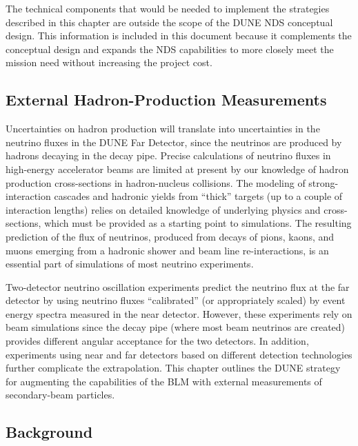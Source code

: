 The technical components that would be needed to implement the strategies 
described in this chapter are outside the scope of the DUNE NDS conceptual 
design. This information is included in this document because it complements the conceptual 
design and expands the NDS capabilities to more closely meet the mission need without increasing the project cost.

\subsection{External Hadron-Production Measurements}
\label{sec:detectors-nd-external-hadron}

Uncertainties on hadron production will translate into uncertainties in the neutrino fluxes
in the DUNE Far Detector, since the neutrinos are produced by hadrons decaying in the decay pipe. Precise calculations of neutrino fluxes in high-energy accelerator beams are limited
at present by our knowledge of hadron production cross-sections in hadron-nucleus collisions. 
The modeling of strong-interaction cascades and hadronic yields from ``thick'' targets
(up to a couple of interaction lengths) relies on detailed knowledge of underlying physics
and cross-sections, which must be provided as a starting point to simulations. The resulting 
prediction of the flux of neutrinos, produced from decays of pions, kaons, and muons
emerging from a hadronic shower and beam line re-interactions, is an essential part
of simulations of most neutrino experiments. 

Two-detector neutrino oscillation experiments 
predict the neutrino flux at the far detector by using neutrino fluxes ``calibrated'' (or
appropriately scaled) by event energy spectra measured in the near detector. However,
these experiments rely on beam simulations since the decay pipe (where most beam
neutrinos are created) provides different angular acceptance for the two detectors. In addition, 
experiments using near and far detectors based on different detection technologies further complicate the extrapolation. This chapter outlines the DUNE strategy for augmenting the capabilities of the BLM with
external measurements of secondary-beam particles. 

\subsection{Background}


